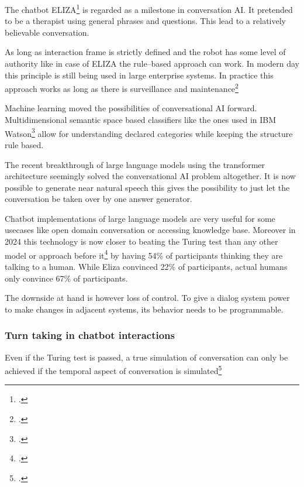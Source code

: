 \documentclass[12pt]{report}
\begin{document}
{\par
The chatbot ELIZA\footcite{weizenbaum1966eliza} is regarded as a milestone in conversation AI.
It pretended to be a therapist
using general phrases and questions.
This lead to a relatively believable conversation.

As long as interaction frame is strictly defined and
the robot has some level of authority
like in case of ELIZA
the rule–based approach can work.
In modern day this principle is still being used in large enterprise systems.
In practice this approach works as long as there is surveillance and maintenance\footcite{kolosova2022}

\par
Machine learning moved the possibilities of conversational AI forward.
Multidimensional semantic space based classifiers like the ones used in IBM Watson\footcite{building_watson_2010}
allow for understanding declared categories while keeping the structure rule based.

\par
The recent breakthrough of large language models using the transformer architecture
seemingly solved the conversational AI problem altogether.
It is now possible to generate near natural speech
this gives the possibility to just let the conversation be taken over by one answer generator.

Chatbot implementations of large language models are very useful for some usecases
like open domain conversation or accessing knowledge base.
Moreover in 2024 this technology is now closer to beating the Turing test than
any other model or approach before it\footcite{jones2024peopledistinguishgpt4human}
by having 54\% of participants thinking
they are talking to a human.
While Eliza convinced 22\% of participants,
actual humans only convince 67\% of participants.

\par The downside at hand is however loss of control.
To give a dialog system power to make changes in adjacent systems,
its behavior needs to be programmable.

\subsubsection{Turn taking in chatbot interactions}

\par
Even if the Turing test is passed,
a true simulation of conversation
can only be achieved if the temporal aspect of conversation
is simulated\footcite{optimizing-turn-taking}

}
\end{document}
